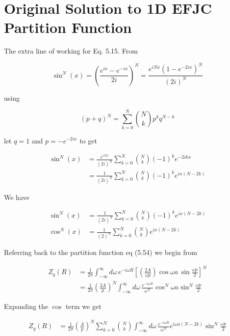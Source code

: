 \documentclass[a4paper,12pt,titlepage]{report}
\begin{document}
\section*{Original Solution to 1D EFJC Partition Function}

The extra line of working for Eq. 5.15. From 

\begin{equation}
\sin^{N}\left(x\right) = \left( \frac{e^{ix}-e^{-ix}}{2i} \right)^N=\frac{e^{iNx}\left(1-e^{-2ix}\right)^{N}}{\left(2i\right)^{N}}
\end{equation}

using

\begin{equation}
\left(p+q\right)^{N}=\sum^{N}_{k=0}\binom{N}{k} p^{k} q^{N-k}
\end{equation}

let $q=1$ and $p=-e^{-2ix}$ to get

\begin{align}
\sin^{N}\left(x\right) &= \frac{e^{iNx}}{\left(2i\right)^{N}} \sum^{N}_{k=0}\binom{N}{k}(-1)^{k} e^{-2ikx}\\
&=\frac{1}{\left(2i\right)^{N}} \sum^{N}_{k=0}\binom{N}{k}(-1)^{k} e^{ix(N-2k)}
\end{align}

We have

\begin{align}
\sin^{N}\left(x\right) &= \frac{1}{\left(2i\right)^{N}} \sum^{N}_{k=0}\binom{N}{k}(-1)^{k} e^{ix(N-2k)} \\
\cos^{N}\left(x\right) &= \frac{1}{\left(2\right)^{N}} \sum^{N}_{k=0}\binom{N}{k} e^{ix(N-2k)}
\end{align}

Referring back to the partition function eq (5.54) we begin from 

\begin{align}
Z_{q}\left(R\right) &= \frac{1}{2 \pi}\int_{-\infty}^{\infty}d\omega\, e^{-i\omega R}\left[\left(\frac{2A}{\omega p}\right)\cos\omega a\,\sin\frac{\omega p}{2}\right]^{N}\label{PartitionFunctionUnsolved1D}\\
&= \frac{1}{2 \pi} \left(\frac{2A}{p}\right)^{N}\int_{-\infty}^{\infty}d\omega\, \frac{e^{-i\omega R}}{\omega^{N}}\cos^{N}\omega a \sin^{N}\frac{\omega p}{2}
\end{align}

Expanding the $\cos$ term we get

\begin{align}
Z_{q}\left(R\right) &= \frac{1}{2 \pi} \left(\frac{A}{p}\right)^{N}\sum^{N}_{k=0}\binom{N}{k}\int_{-\infty}^{\infty}d\omega\, \frac{e^{-i\omega R}}{\omega^{N}} e^{i\omega a(N-2k)}\sin^{N}\frac{\omega p}{2}
\end{align}
\end{document}
